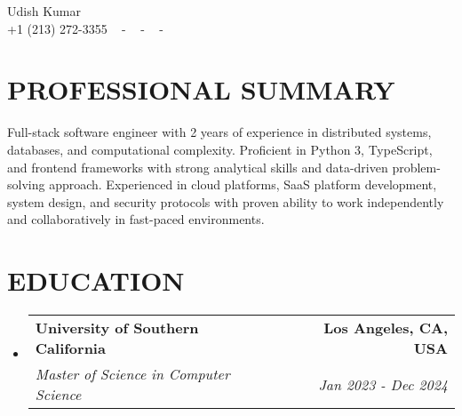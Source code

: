 \documentclass[letterpaper,11pt]{article}
\makeatletter
\newcommand{\resumeSubheading}[4]{
  \vspace{-2pt}\item
    \begin{tabular*}{1.0\textwidth}[t]{l@{\extracolsep{\fill}}r}
      \textbf{\large#1} & \textbf{\small #2} \\
      \textit{\large#3} & \textit{\small #4} \\
      
    \end{tabular*}\vspace{-7pt}
}
\newcommand{\resumeSubHeadingListStart}{\begin{itemize}[leftmargin=0.0in, label={}]}
\newcommand{\resumeSubHeadingListEnd}{\end{itemize}}
\makeatother
\begin{document}


\begin{center}
    {\huge Udish Kumar} \\ \vspace{2pt} 
    {+1 (213) 272-3355} ~ 
    \small{-}
    \href{mailto:udishkum@usc.edu}{\color{blue}{udishkum@usc.edu}} ~ 
    \small{-}
    \href{https://linkedin.com/in/iudishkumar}{ \color{blue}{linkedin.com/in/iudishkumar}}  ~
    \small{-}
    \href{https://github.com/udishkumar}{ \color{blue}{github.com/udishkumar}} ~
    \vspace{-7pt}
\end{center}

\section{\color{airforceblue}PROFESSIONAL SUMMARY}
\justifying\normalsize{Full-stack software engineer with 2 years of experience in distributed systems, databases, and computational complexity. Proficient in Python 3, TypeScript, and frontend frameworks with strong analytical skills and data-driven problem-solving approach. Experienced in cloud platforms, SaaS platform development, system design, and security protocols with proven ability to work independently and collaboratively in fast-paced environments.}
\vspace{-10pt}

\section{\color{airforceblue}EDUCATION}
  \resumeSubHeadingListStart
    \resumeSubheading
      {University of Southern California}{Los Angeles, CA, USA}
      {Master of Science in Computer Science}{Jan 2023 - Dec 2024}
    \vspace{-4pt}
  \resumeSubHeadingListEnd
  \vspace{-10pt}

\end{document}
